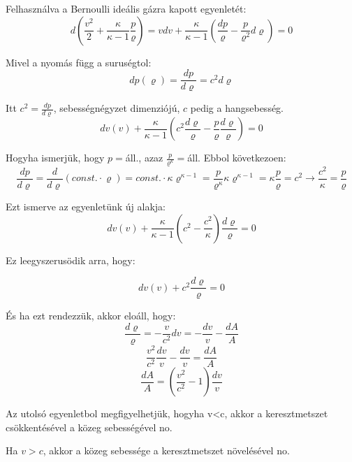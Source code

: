 \documentclass[a4paper,titlepage,12pt]{article}
\begin{document}
Felhasználva a Bernoulli ideális gázra kapott egyenletét: 
\begin{equation*}
d(\frac{v^{2}}{2}+\frac{\kappa}{\kappa-1}\frac{p}{\varrho})=vdv+\frac{\kappa}{\kappa-1}(\frac{dp}{\varrho}-\frac{p}{\varrho^{2}}d\varrho)=0 
\end{equation*}

Mivel a nyomás függ a suruségtol: 
\begin{equation*}
dp(\varrho)=\frac{dp}{d\varrho}=c^{2}d\varrho
\end{equation*}

Itt $c^{2}=\frac{dp}{d\varrho}$, sebességnégyzet dimenziójú, $c$ pedig a hangsebesség. 
\begin{equation*}
dv(v)+\frac{\kappa}{\kappa-1}(c^{2}\frac{d\varrho}{\varrho}-\frac{p}{\varrho}\frac{d\varrho}{\varrho})=0
\end{equation*}

Hogyha ismerjük, hogy $p=$áll., azaz $\frac{p}{\varrho^{\kappa}}=$áll. Ebbol következoen: 
\begin{equation*}
\frac{dp}{d\varrho}=\frac{d}{d\varrho}(const.\cdot\varrho)=const.\cdot\kappa\varrho^{\kappa-1}=\frac{p}{\varrho^{\kappa}}\kappa\varrho^{\kappa-1}=\kappa\frac{p}{\varrho}=c^{2}\longrightarrow\frac{c^{2}}{\kappa}=\frac{p}{\varrho}
\end{equation*}

Ezt ismerve az egyenletünk új alakja: 
\begin{equation*}
dv(v)+\frac{\kappa}{\kappa-1}(c^{2}-\frac{c^{2}}{\kappa})\frac{d\varrho}{\varrho}=0
\end{equation*}

Ez leegyszerusödik arra, hogy:

\begin{equation*}
dv(v)+c^{2}\frac{d\varrho}{\varrho}=0
\end{equation*}

És ha ezt rendezzük, akkor eloáll, hogy: 
\begin{equation*}
\frac{d\varrho}{\varrho}=
-\frac{v}{c^{2}}dv=-\frac{dv}{v}-\frac{dA}{A}
\end{equation*} 
\begin{equation*}
\frac{v^{2}}{c^{2}}\frac{dv}{v}-\frac{dv}{v}=\frac{dA}{A} 
\end{equation*} 
\begin{equation*}
\frac{dA}{A}=(\frac{v^{2}}{c^{2}}-1)\frac{dv}{v} 
\end{equation*}

Az utolsó egyenletbol megfigyelhetjük, hogyha v<c, akkor a keresztmetszet csökkentésével a közeg sebességével no.

Ha $v>c$, akkor a közeg sebessége a keresztmetszet növelésével no.
\end{document}
